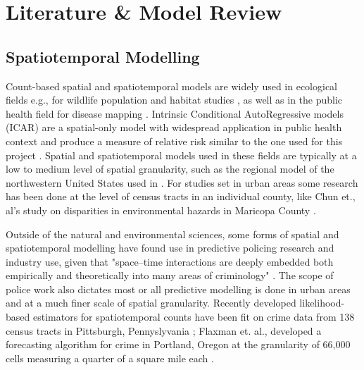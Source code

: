 
\chapter{Literature \& Model Review}
\label{literature_review}

\section{Spatiotemporal Modelling}

Count-based spatial and spatiotemporal models are widely used in ecological fields e.g., for wildlife population and habitat studies \cite{cobi_2008}, as well as in the public health field for disease mapping \cite{schrodle_2011}. Intrinsic  Conditional AutoRegressive models (ICAR) are a spatial-only model with widespread application in public health context and produce a measure of relative risk similar to the one used for this project \cite{wakefield2006disease}.   Spatial and spatiotemporal models used in these fields are typically at a low to medium level of spatial granularity, such as the regional model of the northwestern United States used in \cite{cobi_2008}. For studies set in urban areas some research has been done at the level of census tracts in an individual county, like Chun et., al's study on disparities in environmental hazards in Maricopa County \cite{chun_2012}. \par

Outside of the natural and environmental sciences, some forms of spatial and spatiotemporal modelling have found use in predictive policing research and industry use, given that "space–time interactions are deeply embedded both empirically and theoretically into many areas of criminology" \cite{li_2014}. The scope of police work also dictates most or all predictive modelling is done in urban areas and at a much finer scale of spatial granularity. Recently developed likelihood-based estimators for spatiotemporal counts have been fit on crime data from 138 census tracts in Pittsburgh, Pennyslyvania \cite{liesenfeld_2017}; Flaxman et. al., developed a forecasting algorithm for crime in Portland, Oregon at the granularity of 66,000 cells measuring a quarter of a square mile each \cite{flaxman_2018}.
 \par

